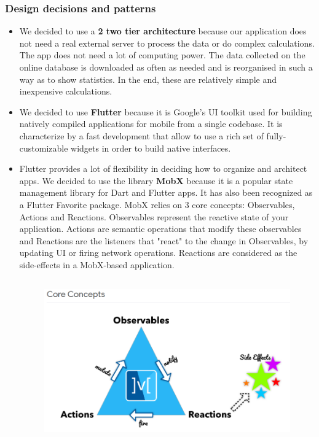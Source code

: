 \documentclass [12pt]{article}
\begin{document}
\subsubsection{Design decisions and patterns}
\begin{itemize}
\item We decided to use a \textbf{2 two tier architecture} because our application does not need a real external server to process the data or do complex calculations. The app does not need a lot of computing power. The data collected on the online database is downloaded as often as needed and is reorganised in such a way as to show statistics. In the end, these are relatively simple and inexpensive calculations.
\item We decided to use \textbf{Flutter} because it is Google’s UI toolkit used for building natively compiled applications for mobile from a single codebase. It is characterize by a fast development that allow to
use a rich set of fully-customizable widgets in order to build native interfaces.
\item Flutter provides a lot of flexibility in deciding how to organize and architect apps. We decided to use the library \textbf{MobX} because it is a popular state management library for Dart and Flutter apps. It has also been recognized as a Flutter Favorite package.
MobX relies on 3 core concepts: Observables, Actions and Reactions. Observables represent the reactive state of your application. Actions are semantic operations that modify these observables and Reactions are the listeners that "react" to the change in Observables, by updating UI or firing network operations. Reactions are considered as the side-effects in a MobX-based application.
\begin{figure}[ht!]
\centering
\includegraphics[height=7cm, width=12cm]{MobX.png}
\end{figure}

\end{itemize}
\end{document}
